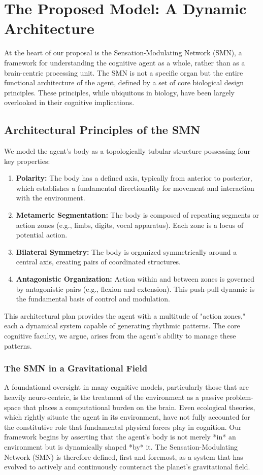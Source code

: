 \section{The Proposed Model: A Dynamic Architecture}
At the heart of our proposal is the Sensation-Modulating Network (SMN), a framework for understanding the cognitive agent as a whole, rather than as a brain-centric processing unit. The SMN is not a specific organ but the entire functional architecture of the agent, defined by a set of core biological design principles. These principles, while ubiquitous in biology, have been largely overlooked in their cognitive implications.

\subsection*{Architectural Principles of the SMN}
We model the agent's body as a topologically tubular structure possessing four key properties:
\begin{enumerate}
    \item \textbf{Polarity:} The body has a defined axis, typically from anterior to posterior, which establishes a fundamental directionality for movement and interaction with the environment.
    \item \textbf{Metameric Segmentation:} The body is composed of repeating segments or action zones (e.g., limbs, digits, vocal apparatus). Each zone is a locus of potential action.
    \item \textbf{Bilateral Symmetry:} The body is organized symmetrically around a central axis, creating pairs of coordinated structures.
    \item \textbf{Antagonistic Organization:} Action within and between zones is governed by antagonistic pairs (e.g., flexion and extension). This push-pull dynamic is the fundamental basis of control and modulation.
\end{enumerate}
This architectural plan provides the agent with a multitude of "action zones," each a dynamical system capable of generating rhythmic patterns. The core cognitive faculty, we argue, arises from the agent's ability to manage these patterns.

\subsubsection*{The SMN in a Gravitational Field}
A foundational oversight in many cognitive models, particularly those that are heavily neuro-centric, is the treatment of the environment as a passive problem-space that places a computational burden on the brain. Even ecological theories, which rightly situate the agent in its environment, have not fully accounted for the constitutive role that fundamental physical forces play in cognition. Our framework begins by asserting that the agent’s body is not merely *in* an environment but is dynamically shaped *by* it. The Sensation-Modulating Network (SMN) is therefore defined, first and foremost, as a system that has evolved to actively and continuously counteract the planet's gravitational field.

